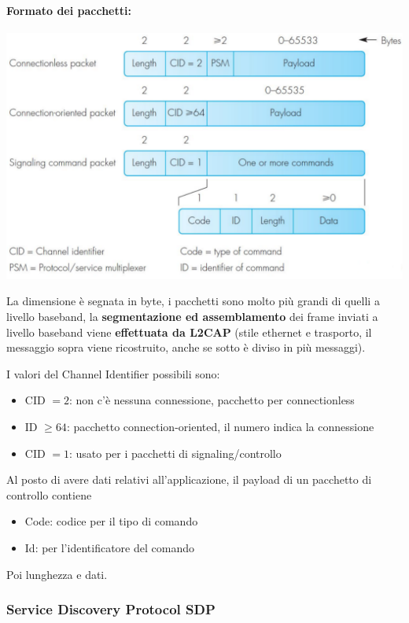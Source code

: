 \paragraph{Formato dei pacchetti:}
\begin{center}
	\includegraphics[width=0.9\linewidth]{img/wpan/l2cappacket}
\end{center}
La dimensione è segnata in byte, i pacchetti sono molto più grandi di quelli a livello baseband, la \textbf{segmentazione ed assemblamento} dei frame inviati a livello baseband viene \textbf{effettuata da L2CAP} (stile ethernet e trasporto, il messaggio sopra viene ricostruito, anche se sotto è diviso in più messaggi).

I valori del Channel Identifier possibili sono: 
\begin{itemize}
	\item CID $= 2$: non c'è nessuna connessione, pacchetto per connectionless
	\item ID $\geq 64$: pacchetto connection-oriented, il numero indica la connessione
	\item CID $=1$: usato per i pacchetti di signaling/controllo
\end{itemize}

Al posto di avere dati relativi all'applicazione, il payload di un pacchetto di controllo contiene
\begin{itemize}
	\item Code: codice per il tipo di comando 
	\item Id: per l'identificatore del comando
\end{itemize}
Poi lunghezza e dati.

\subsubsection{Service Discovery Protocol SDP}

